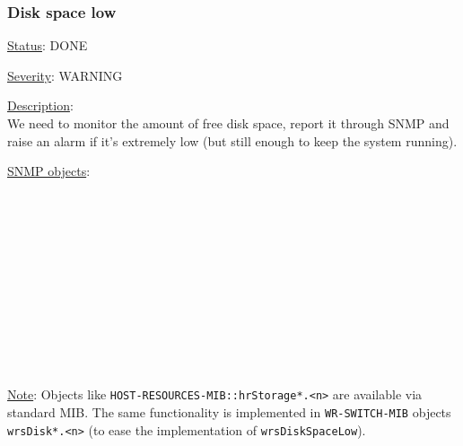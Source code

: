 \subsubsection{\bf Disk space low}
		\label{fail:other:no_disk}
		\begin{pck_descr}
			\item [] \underline{Status}: DONE
			\item [] \underline{Severity}: WARNING
			\item [] \underline{Description}:\\
				We need to monitor the amount of free disk space, report it through SNMP
				and raise an alarm if it's extremely low (but still enough to keep the
				system running).
			\item [] \underline{SNMP objects}:\\
        {\footnotesize
				\\
				\\
				\\
				\\
				\\
				\\
				\\
				\\
				\\
				\\
				\\
         }
			\item [] \underline{Note}:
				Objects like \texttt{HOST-RESOURCES-MIB::hrStorage*.<n>} are available
				via standard MIB. The same functionality is implemented in
				\texttt{WR-SWITCH-MIB} objects \texttt{wrsDisk*.<n>} (to ease the
				implementation of \texttt{wrsDiskSpaceLow}).
		\end{pck_descr}

